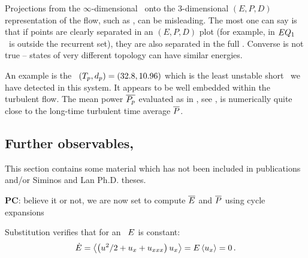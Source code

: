 Projections from the $\infty$-dimensional \statesp\ onto the 3-dimensional
$(E,P,D)$ representation of the flow, such as
, can be misleading.
The most one can say is that if points are clearly separated in an
$(E,P,D)$ plot (for example, in 
$EQ_{1}$ \eqv\ is outside the recurrent set), they are also separated
in the full \statesp.  Converse is not true -- states of
very different topology can have similar energies.

An example is the \rpo\ $({T_{p}},d_p) = (32.8,10.96)$
which {is the least unstable short \rpo\ we have detected in this system.
It} appears to be well embedded within the turbulent flow. The mean power
$\overline{P_p}$ evaluated as in , see ,
is numerically quite close to the long-time turbulent time average
$\overline{P}$.

\subsection{Further observables, \KS}
\label{sec:moreObs}

\ifboyscout
This section contains some material which has not been included in
publications and/or Siminos and Lan Ph.D. theses.

{\bf PC}: believe it or not, we are now set to compute
    $\overline{E}$ and $\overline{P}$
    using cycle expansions

Substitution %
verifies that for an \eqv\ $E$ is constant:
\[
   \dot{E} =
\left\langle { \left({u^2}/{2} + u_{x} + u_{xxx} \right) u_x} \right\rangle
    = E \left\langle { u_x } \right\rangle=0
    \,.
\]
\fi


